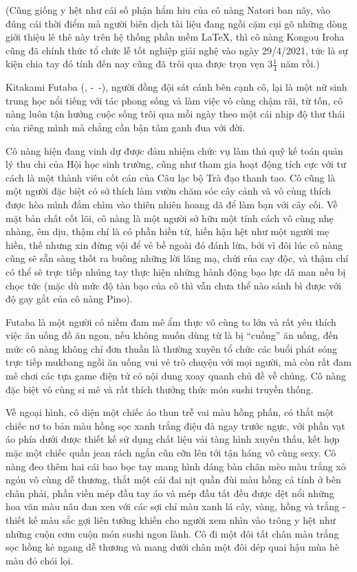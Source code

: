 \documentclass[../main.tex]{subfiles}
\begin{document}
(Cũng giống y hệt như cái số phận hẩm hiu của cô nàng Natori ban nãy, vào đúng cái thời điểm mà người biên dịch tài liệu đang ngồi cặm cụi gõ những dòng giới thiệu lê thê này trên hệ thống phần mềm \LaTeX, thì cô nàng Kongou Iroha cũng đã chính thức tổ chức lễ tốt nghiệp giải nghệ vào ngày 29/4/2021, tức là sự kiện chia tay đó tính đến nay cũng đã trôi qua được trọn vẹn 3\(\frac{1}{4}\) năm rồi.)

Kitakami Futaba (, -\ -), người đồng đội sát cánh bên cạnh cô, lại là một nữ sinh trung học nổi tiếng với tác phong sống và làm việc vô cùng chậm rãi, từ tốn, cô nàng luôn tận hưởng cuộc sống trôi qua mỗi ngày theo một cái nhịp độ thư thái của riêng mình mà chẳng cần bận tâm ganh đua với đời.

Cô nàng hiện đang vinh dự được đảm nhiệm chức vụ làm thủ quỹ kế toán quản lý thu chi của Hội học sinh trường, cũng như tham gia hoạt động tích cực với tư cách là một thành viên cốt cán của Câu lạc bộ Trà đạo thanh tao. Cô cũng là một người đặc biệt có sở thích làm vườn chăm sóc cây cảnh và vô cùng thích được hòa mình đắm chìm vào thiên nhiên hoang dã để làm bạn với cây cối. Về mặt bản chất cốt lõi, cô nàng là một người sở hữu một tính cách vô cùng nhẹ nhàng, êm dịu, thậm chí là có phần hiền từ, hiền hậu hệt như một người mẹ hiền, thế nhưng xin đừng vội để vẻ bề ngoài đó đánh lừa, bởi vì đôi lúc cô nàng cũng sẽ sẵn sàng thốt ra buông những lời lăng mạ, chửi rủa cay độc, và thậm chí có thể sẽ trực tiếp nhúng tay thực hiện những hành động bạo lực dã man nếu bị chọc tức (mặc dù mức độ tàn bạo của cô thì vẫn chưa thể nào sánh bì được với độ gay gắt của cô nàng Pino).


Futaba là một người có niềm đam mê ẩm thực vô cùng to lớn và rất yêu thích việc ăn uống đồ ăn ngon, nếu không muốn dùng từ là bị ``cuồng'' ăn uống, đến mức cô nàng không chỉ đơn thuần là thường xuyên tổ chức các buổi phát sóng trực tiếp mukbang ngồi ăn uống vui vẻ trò chuyện với mọi người, mà còn rất đam mê chơi các tựa game điện tử có nội dung xoay quanh chủ đề về chúng. Cô nàng đặc biệt vô cùng si mê và rất thích thưởng thức món sushi truyền thống.

Về ngoại hình, cô diện một chiếc áo thun trễ vai màu hồng phấn, có thắt một chiếc nơ to bản màu hồng sọc xanh trắng điệu đà ngay trước ngực, với phần vạt áo phía dưới được thiết kế sử dụng chất liệu vải tàng hình xuyên thấu, kết hợp mặc một chiếc quần jean rách ngắn cũn cỡn lên tới tận háng vô cùng sexy. Cô nàng đeo thêm hai cái bao bọc tay mang hình dáng bàn chân mèo màu trắng xỏ ngón vô cùng dễ thương, thắt một cái đai nịt quần đùi màu hồng cá tính ở bên chân phải, phần viền mép đầu tay áo và mép đầu tất đều được dệt nổi những hoa văn màu nâu đan xen với các sợi chỉ màu xanh lá cây, vàng, hồng và trắng - thiết kế màu sắc gợi liên tưởng khiến cho người xem nhìn vào trông y hệt như những cuộn cơm cuộn món sushi ngon lành. Cô đi một đôi tất chân màu trắng sọc hồng kẻ ngang dễ thương và mang dưới chân một đôi dép quai hậu mùa hè màu đỏ chói lọi.
\end{document}
